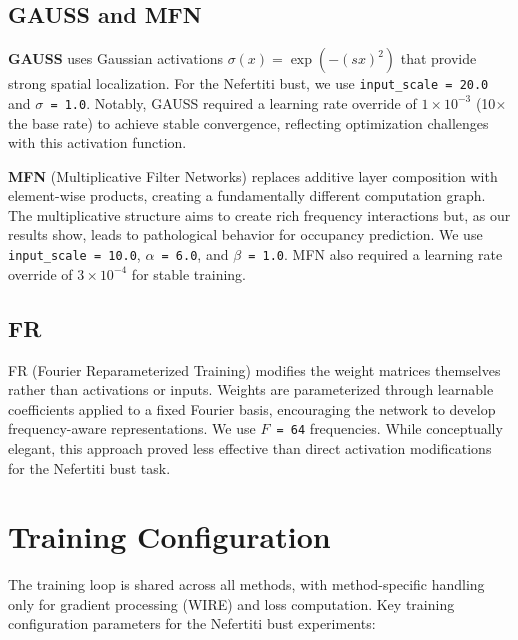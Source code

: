 \subsection{GAUSS and MFN}

\textbf{GAUSS} uses Gaussian activations $\sigma(x) = \exp(-(sx)^2)$ that provide strong spatial localization. For the Nefertiti bust, we use \texttt{input\_scale = 20.0} and \texttt{$\sigma$ = 1.0}. Notably, GAUSS required a learning rate override of $1 \times 10^{-3}$ (10$\times$ the base rate) to achieve stable convergence, reflecting optimization challenges with this activation function.

\textbf{MFN} (Multiplicative Filter Networks) replaces additive layer composition with element-wise products, creating a fundamentally different computation graph. The multiplicative structure aims to create rich frequency interactions but, as our results show, leads to pathological behavior for occupancy prediction. We use \texttt{input\_scale = 10.0}, \texttt{$\alpha$ = 6.0}, and \texttt{$\beta$ = 1.0}. MFN also required a learning rate override of $3 \times 10^{-4}$ for stable training.

\subsection{FR}

FR (Fourier Reparameterized Training) modifies the weight matrices themselves rather than activations or inputs. Weights are parameterized through learnable coefficients applied to a fixed Fourier basis, encouraging the network to develop frequency-aware representations. We use \texttt{$F$ = 64} frequencies. While conceptually elegant, this approach proved less effective than direct activation modifications for the Nefertiti bust task.

\section{Training Configuration}

The training loop is shared across all methods, with method-specific handling only for gradient processing (WIRE) and loss computation. Key training configuration parameters for the Nefertiti bust experiments:


